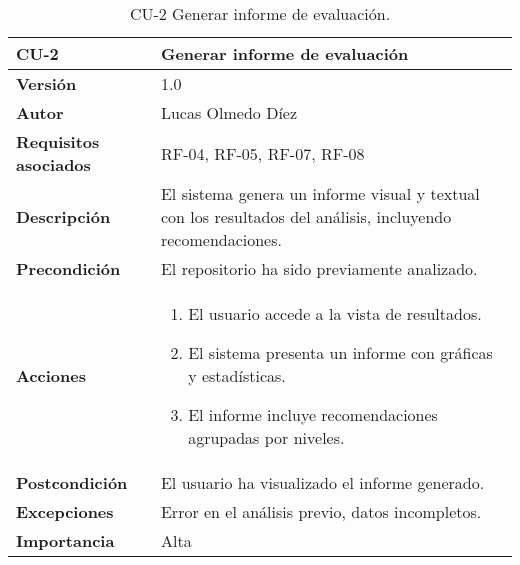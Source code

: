 \begin{table}[p]
	\centering
	\begin{tabularx}{\linewidth}{ p{} p{} }
		\toprule
		\textbf{CU-2}    & Generar informe de evaluación \\
		\toprule
		\textbf{Versión}              & 1.0 \\
		\textbf{Autor}                & Lucas Olmedo Díez \\
		\textbf{Requisitos asociados} & RF-04, RF-05, RF-07, RF-08 \\
		\textbf{Descripción}          & El sistema genera un informe visual y textual con los resultados del análisis, incluyendo recomendaciones. \\
		\textbf{Precondición}         & El repositorio ha sido previamente analizado. \\
		\textbf{Acciones}             &
		\begin{enumerate}
			\item El usuario accede a la vista de resultados.
			\item El sistema presenta un informe con gráficas y estadísticas.
			\item El informe incluye recomendaciones agrupadas por niveles.
		\end{enumerate}\\
		\textbf{Postcondición}        & El usuario ha visualizado el informe generado. \\
		\textbf{Excepciones}          & Error en el análisis previo, datos incompletos. \\
		\textbf{Importancia}          & Alta \\
		\bottomrule
	\end{tabularx}
	\caption{CU-2 Generar informe de evaluación.}
\end{table}

